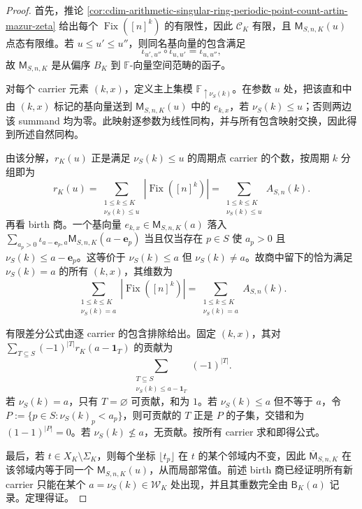 \begin{proof}
首先，推论 \ref{cor:cdim-arithmetic-singular-ring-periodic-point-count-artin-mazur-zeta} 给出每个 \(\operatorname{Fix}([n]^k)\) 的有限性，因此 \(\mathcal C_K\) 有限，且 \(\mathsf M_{S,n,K}(u)\) 点态有限维。若 \(u\le u'\le u''\)，则同名基向量的包含满足
\[
\iota_{u',u''}\circ\iota_{u,u'}=\iota_{u,u''},
\]
故 \(\mathsf M_{S,n,K}\) 是从偏序 \(B_K\) 到 \(\mathbb F\)-向量空间范畴的函子。

对每个 carrier 元素 \((k,x)\)，定义主上集模 \(\mathbb F_{\uparrow\nu_S(k)}\)。在参数 \(u\) 处，把该直和中由 \((k,x)\) 标记的基向量送到 \(\mathsf M_{S,n,K}(u)\) 中的 \(e_{k,x}\)，若 \(\nu_S(k)\le u\)；否则两边该 summand 均为零。此映射逐参数为线性同构，并与所有包含映射交换，因此得到所述自然同构。

由该分解，\(r_K(u)\) 正是满足 \(\nu_S(k)\le u\) 的周期点 carrier 的个数，按周期 \(k\) 分组即为
\[
r_K(u)=\sum_{\substack{1\le k\le K\\ \nu_S(k)\le u}}|\operatorname{Fix}([n]^k)|
=\sum_{\substack{1\le k\le K\\ \nu_S(k)\le u}}A_{S,n}(k).
\]
再看 birth 商。一个基向量 \(e_{k,x}\in\mathsf M_{S,n,K}(a)\) 落入
\(\sum_{a_p>0}\iota_{a-\mathbf e_p,a}\mathsf M_{S,n,K}(a-\mathbf e_p)\) 当且仅当存在 \(p\in S\) 使 \(a_p>0\) 且 \(\nu_S(k)\le a-\mathbf e_p\)。这等价于 \(\nu_S(k)\le a\) 但 \(\nu_S(k)\ne a\)。故商中留下的恰为满足 \(\nu_S(k)=a\) 的所有 \((k,x)\)，其维数为
\[
\sum_{\substack{1\le k\le K\\ \nu_S(k)=a}}|\operatorname{Fix}([n]^k)|
=\sum_{\substack{1\le k\le K\\ \nu_S(k)=a}}A_{S,n}(k).
\]

有限差分公式由逐 carrier 的包含排除给出。固定 \((k,x)\)，其对
\(\sum_{T\subseteq S}(-1)^{|T|}r_K(a-\mathbf 1_T)\) 的贡献为
\[
\sum_{\substack{T\subseteq S\\ \nu_S(k)\le a-\mathbf 1_T}}(-1)^{|T|}.
\]
若 \(\nu_S(k)=a\)，只有 \(T=\varnothing\) 可贡献，和为 \(1\)。若 \(\nu_S(k)\le a\) 但不等于 \(a\)，令
\(P:=\{p\in S:\nu_S(k)_p<a_p\}\)，则可贡献的 \(T\) 正是 \(P\) 的子集，交错和为 \((1-1)^{|P|}=0\)。若 \(\nu_S(k)\nleq a\)，无贡献。按所有 carrier 求和即得公式。

最后，若 \(t\in X_K\setminus\Sigma_K\)，则每个坐标 \(\lfloor t_p\rfloor\) 在 \(t\) 的某个邻域内不变，因此 \(\overline{\mathsf M}_{S,n,K}\) 在该邻域内等于同一个 \(\mathsf M_{S,n,K}(u)\)，从而局部常值。前述 birth 商已经证明所有新 carrier 只能在某个 \(a=\nu_S(k)\in\mathcal W_K\) 处出现，并且其重数完全由 \(\mathsf B_K(a)\) 记录。定理得证。
\end{proof}
